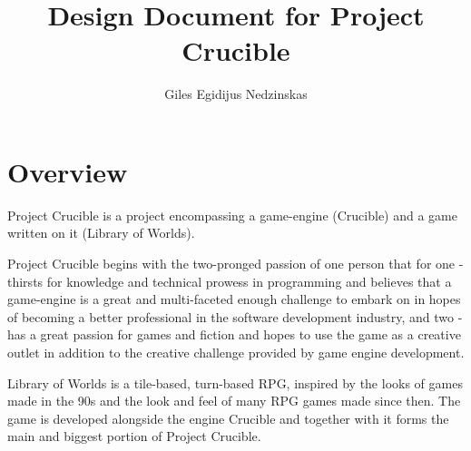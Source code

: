 \documentclass[a4paper,10pt]{book}
\begin{document}
\newcommand{\Projectname}{Project Crucible}
\newcommand{\Enginename}{Crucible}
\newcommand{\Gamename}{Library of Worlds}
\newcommand{\TODO}[1]{
  \colorbox{rose}{
  \begin{tabular}{l | l}
    \textcolor{red}{TODO} &
    \begin{minipage}{\linewidth - \evensidemargin - \tabcolsep}
      \textcolor{red}{#1}
    \end{minipage}
  \end{tabular}
  }
}
\newcommand{\textbi}[1]{\textbf{\textit{#1}}}

\author{Giles Egidijus Nedzinskas}
\title{Design Document for \Projectname{}}
\maketitle{}

\tableofcontents

\chapter{Overview}
\Projectname{} is a project encompassing a game-engine (\Enginename{}) and a game written on it (\Gamename{}).

\Projectname{} begins with the two-pronged passion of one person that for one - thirsts for knowledge and technical prowess in programming and believes that a game-engine is a great and multi-faceted enough challenge to embark on in hopes of becoming a better professional in the software development industry, and two - has a great passion for games and fiction and hopes to use the game as a creative outlet in addition to the creative challenge provided by game engine development.

\Gamename{} is a tile-based, turn-based RPG, inspired by the looks of games made in the 90s and the look and feel of many RPG games made since then. The game is developed alongside the engine \Enginename{} and together with it forms the main and biggest portion of \Projectname{}.
\end{document}
